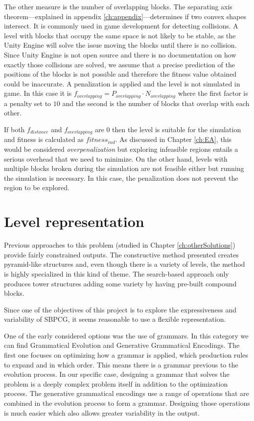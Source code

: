 The other measure is the number of overlapping blocks. The separating axis theorem---explained in appendix \ref{ch:appendix}---determines if two convex shapes intersect. It is commonly used in game development for detecting collisions. A level with blocks that occupy the same space is not likely to be stable, as the Unity Engine will solve the issue moving the blocks until there is no collision. Since Unity Engine is not open source and there is no documentation on how exactly those collisions are solved, we assume that a precise prediction of the positions of the blocks is not possible and therefore the fitness value obtained could be inaccurate. A penalization is applied and the level is not simulated in game. In this case it is $f_{overlapping} = P_{overlapping} \cdot N_{overlapping}$ where the first factor is a penalty set to $10$ and the second is the number of blocks that overlap with each other. 

If both $f_{distance}$ and $f_{overlapping}$ are $0$ then the level is suitable for the simulation and fitness is calculated as $fitness_{ind}$. As discussed in Chapter \ref{ch:EA}, this would be considered \textit{overpenalization} but exploring infeasible regions entails a serious overhead that we need to minimize. On the other hand, levels with multiple blocks broken during the simulation are not feasible either but running the simulation is necessary. In this case, the penalization does not prevent the region to be explored.
\section{Level representation}

Previous approaches to this problem (studied in Chapter \ref{ch:otherSolutions}) provide fairly constrained outputs. The constructive method presented creates pyramid-like structures and, even though there is a variety of levels, the method is highly specialized in this kind of theme. The search-based approach only produces tower structures adding some variety by having pre-built compound blocks.

Since one of the objectives of this project is to explore the expressiveness and variability of \acs{SBPCG}, it seems reasonable to use a flexible representation. 

One of the early considered options was the use of grammars. In this category we can find Grammatical Evolution\cite{lourencco2015sge} and Generative Grammatical Encodings\cite{hornby2001advantages}. The first one focuses on optimizing how a grammar is applied, which production rules to expand and in which order. This means there is a grammar previous to the evolution process. In our specific case, designing a grammar that solves the problem is a deeply complex problem itself in addition to the optimization process. The generative grammatical encodings use a range of operations that are combined in the evolution process to form a grammar. Designing those operations is much easier which also allows greater variability in the output.

